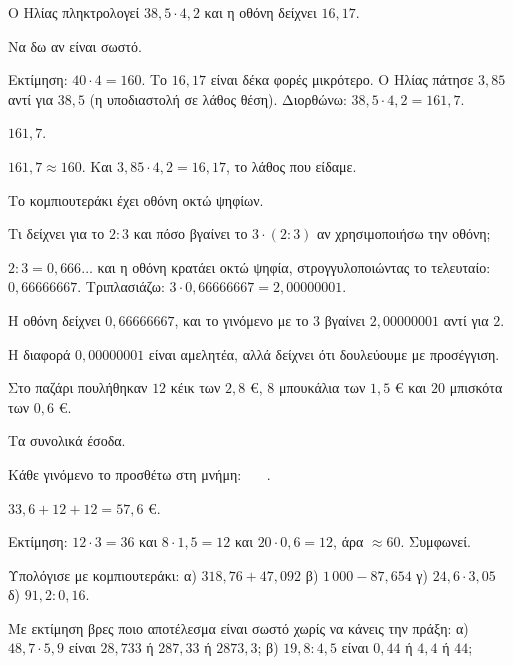 \tixero Ο Ηλίας πληκτρολογεί $38{,}5\cdot4{,}2$ και η οθόνη δείχνει $16{,}17$.\par
\tithelo Να δω αν είναι σωστό.\par
\possindeo Εκτίμηση: $40\cdot4=160$. Το $16{,}17$ είναι δέκα φορές μικρότερο. Ο Ηλίας πάτησε $3{,}85$ αντί για $38{,}5$ (η υποδιαστολή σε λάθος θέση). Διορθώνω: $38{,}5\cdot4{,}2=161{,}7$.\par
\apantisi $161{,}7$.\par
\elegxos $161{,}7\approx160$. Και $3{,}85\cdot4{,}2=16{,}17$, το λάθος που είδαμε.

\tixero Το κομπιουτεράκι έχει οθόνη οκτώ ψηφίων.\par
\tithelo Τι δείχνει για το $2:3$ και πόσο βγαίνει το $3\cdot(2:3)$ αν χρησιμοποιήσω την οθόνη;\par
\possindeo $2:3=0{,}666\ldots$ και η οθόνη κρατάει οκτώ ψηφία, στρογγυλοποιώντας το τελευταίο: $0{,}66666667$. Τριπλασιάζω: $3\cdot0{,}66666667=2{,}00000001$.\par
\apantisi Η οθόνη δείχνει $0{,}66666667$, και το γινόμενο με το $3$ βγαίνει $2{,}00000001$ αντί για $2$.\par
\elegxos Η διαφορά $0{,}00000001$ είναι αμελητέα, αλλά δείχνει ότι δουλεύουμε με προσέγγιση.

\tixero Στο παζάρι πουλήθηκαν $12$ κέικ των $2{,}8$ €, $8$ μπουκάλια των $1{,}5$ € και $20$ μπισκότα των $0{,}6$ €.\par
\tithelo Τα συνολικά έσοδα.\par
\possindeo Κάθε γινόμενο το προσθέτω στη μνήμη: \kpo{}\kis{}\ \kpo{}\kis{}\ \kpo{}\kis{}\ .\par
\apantisi $33{,}6+12+12=57{,}6$ €.\par
\elegxos Εκτίμηση: $12\cdot3=36$ και $8\cdot1{,}5=12$ και $20\cdot0{,}6=12$, άρα $\approx60$. Συμφωνεί.



\ex Υπολόγισε με κομπιουτεράκι: α) $318{,}76+47{,}092$ \quad β) $1\,000-87{,}654$ \quad γ) $24{,}6\cdot3{,}05$ \quad δ) $91{,}2:0{,}16$.

\ex Με εκτίμηση βρες ποιο αποτέλεσμα είναι σωστό χωρίς να κάνεις την πράξη: α) $48{,}7\cdot5{,}9$ είναι $28{,}733$ ή $287{,}33$ ή $2873{,}3$; β) $19{,}8:4{,}5$ είναι $0{,}44$ ή $4{,}4$ ή $44$;


